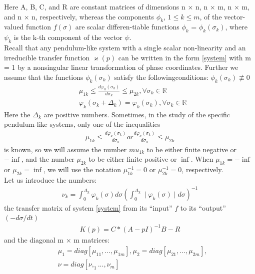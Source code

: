 \documentclass[a4paper]{article}
\begin{document}
Here A, B, C, and R are constant matrices of dimensions n × n, n × m, n × m, and n × n, respectively, whereas the components $\phi_k$, $1 \leq  k \leq m$, of the vector-valued function $f(\sigma)$ are scalar differen-tiable functions $\phi_k$ = $\phi_k(\sigma_k)$, where $\psi_k$ is the k-th component of the vector $\psi$.\\

Recall that any pendulum-like system with a single scalar non-linearity and an irreducible transfer function $\varkappa(p)$ can be written in the form \eqref{system} with m = 1 by a nonsingular linear transformation of phase coordinates. Further we assume that the functions $\phi_k(\sigma_k)$ satisfy the followingconditions: $\phi_k(\sigma_k) \nequiv 0$\\
 \begin{equation}
 \begin{aligned}
&\mu_{1k} \leq \frac{d\varphi_k(\sigma_k)}{d\sigma_k} \leq \mu_{2k}, \forall \sigma_k \in \mathbb{R}\\
&\varphi_k(\sigma_k+\Delta_k) = \varphi_k(\sigma_k), \forall \sigma_k \in \mathbb{R}
 \end{aligned}
\end{equation}
Here the $\Delta_k$ are positive numbers. Sometimes, in the study of the specific pendulum-like systems, only one of the inequalities
 \begin{equation}
 \begin{aligned}
\mu_{1k} \leq \frac{d\varphi_k(\sigma_k)}{d\sigma_k}  or \frac{d\varphi_k(\sigma_k)}{d\sigma_k} \leq \mu_{2k}
 \end{aligned}
\end{equation}
is known, so we will assume the number $mu_{1k}$ to be either finite negative or $-\inf$, and the number $\mu_{2k}$ to be either finite positive or $\inf$.
When $\mu_{1k} = -\inf$ or $\mu_{2k} = \inf$, we will use the notation $\mu_{1k}^{-1} = 0$ or $\mu_{2k}^{-1} = 0$, respectively.\\

Let us introduce the numbers:
 \begin{equation}
 \begin{aligned}
\nu_k = \int_{0}^{\Delta_k} \varphi_k(\sigma) d\sigma (\int_{0}^{\Delta_k} \mid \varphi_k(\sigma) \mid d\sigma)^{-1}
 \end{aligned}
\end{equation}
the transfer matrix of system \eqref{system} from its “input” $f$ to its “output” $(-d\sigma/dt)$
 \begin{equation}
 \begin{aligned}
K(p) = C*(A - pI)^{-1}B - R
\end{aligned}
\end{equation}
and the diagonal m × m matrices:
 \begin{equation}
 \begin{aligned}
&\mu_1 = diag [\mu_{11}, . . . , \mu_{1m}],    \mu_2 = diag [\mu_{21}, . . . , \mu_{2m}],\\
&\nu = diag [\nu, _1. . . , \nu_m]
\end{aligned}
\end{equation}
\end{document}
